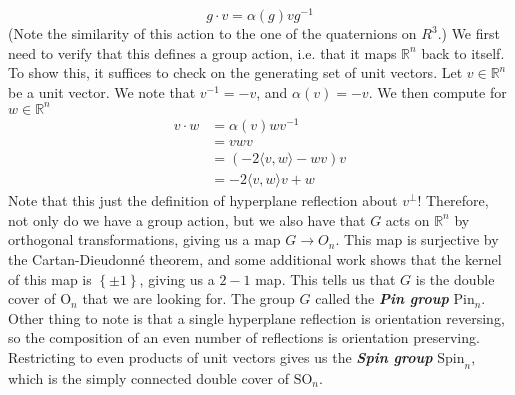 \documentclass[psamsfonts, 12pt]{amsart}
\theoremstyle{definition}
\theoremstyle{remark}
\newcommand{\R}{\mathbb{R}}
\newcommand{\ib}[1]{\textbf{\textit{#1}}}
\newcommand{\SO}{\mathrm{SO}}
\newcommand{\Pin}{\mathrm{Pin}}
\newcommand{\Spin}{\mathrm{Spin}}
\newcommand{\inv}{^{-1}}
\newcommand{\set}[1]{\left\lbrace #1 \right\rbrace}
\begin{document}
\[
g \cdot v = \alpha(g)vg\inv
\]
(Note the similarity of this action to the one of the quaternions on $R^3$.)
We first need to verify that this defines a group action, i.e. that it maps $\R^n$ back
to itself. To show this, it suffices to check on the generating set of unit vectors. Let
$v \in \R^n$ be a unit vector. We note that $v\inv = -v$, and $\alpha(v) = -v$. We then
compute for $w \in \R^n$
\begin{align*}
v \cdot w &= \alpha(v)wv\inv \\
&= vwv \\
&= (-2\langle v,w\rangle -wv)v \\
&= -2\langle v,w\rangle v + w
\end{align*}
%
Note that this just the definition of hyperplane reflection about $v^\perp$! Therefore,
not only do we have a group action, but we also have that $G$ acts on $\R^n$ by
orthogonal transformations, giving us a map $G \to O_n$. This map is surjective by the
Cartan-Dieudonn\'e theorem, and some additional work shows that the kernel of this map
is $\set{\pm 1}$, giving us a $2-1$ map. This tells us that $G$ is the double cover of
$\mathrm{O}_n$ that we are looking for. The group $G$ called the \ib{Pin group}
$\Pin_n$. Other thing to note is that a single hyperplane reflection is orientation
reversing, so the composition of an even number of reflections is orientation
preserving. Restricting to even products of unit vectors gives us the \ib{Spin group}
$\Spin_n$, which is the simply connected double cover of $\SO_n$. \\
%
\end{document}
